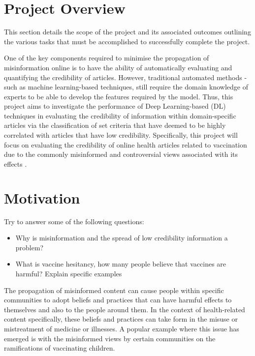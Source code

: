 \documentclass[a4paper,twoside,phd]{BYUPhys}
\begin{document}
\section{Project Overview}
\label{sec:ProjectOverview}
This section details the scope of the project and its associated outcomes outlining the various tasks that must be accomplished to successfully complete the project.

One of the key components required to minimise the propagation of misinformation online is to have the ability of automatically evaluating and quantifying the credibility of articles. However, traditional automated methods - such as machine learning-based techniques, still require the domain knowledge of experts to be able to develop the features required by the model. Thus, this project aims to investigate the performance of Deep Learning-based (DL) techniques in evaluating the credibility of information within domain-specific articles via the classification of set criteria that have deemed to be highly correlated with articles that have low credibility. Specifically, this project will focus on evaluating the credibility of online health articles related to vaccination due to the commonly misinformed and controversial views associated with its effects \cite{Burgess2006}. \newline

\section{Motivation}
\label{sec:Motivation}

Try to answer some of the following questions:

\begin{itemize}
	\item Why is misinformation and the spread of low credibility information a problem?
	\item What is vaccine hesitancy, how many people believe that vaccines are harmful? Explain specific examples
\end{itemize}

The propagation of misinformed content can cause people within specific communities to adopt beliefs and practices that can have harmful effects to themselves and also to the people around them. In the context of health-related content specifically, these beliefs and practices can take form in the misuse or mistreatment of medicine or illnesses. A popular example where this issue has emerged is with the misinformed views by certain communities on the ramifications of vaccinating children. \newline
\end{document}
